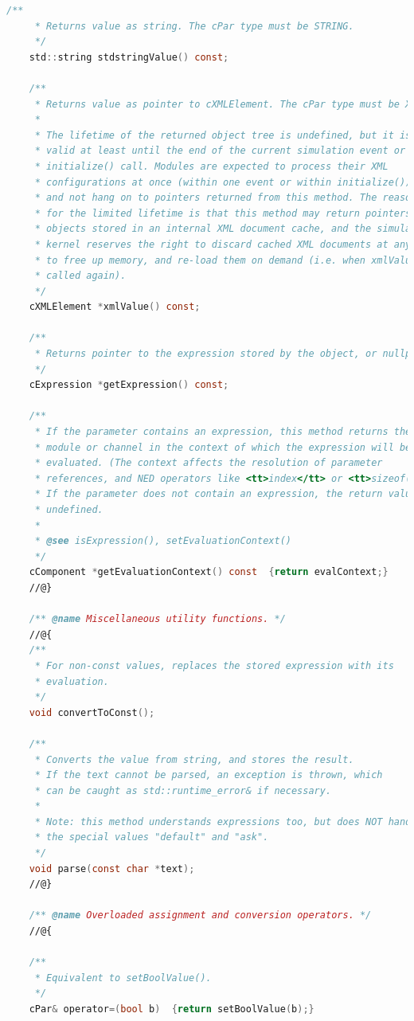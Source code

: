 \begin{lstlisting}[language=c]
    /**
     * Returns value as string. The cPar type must be STRING.
     */
    std::string stdstringValue() const;

    /**
     * Returns value as pointer to cXMLElement. The cPar type must be XML.
     *
     * The lifetime of the returned object tree is undefined, but it is
     * valid at least until the end of the current simulation event or
     * initialize() call. Modules are expected to process their XML
     * configurations at once (within one event or within initialize()),
     * and not hang on to pointers returned from this method. The reason
     * for the limited lifetime is that this method may return pointers to
     * objects stored in an internal XML document cache, and the simulation
     * kernel reserves the right to discard cached XML documents at any time
     * to free up memory, and re-load them on demand (i.e. when xmlValue() is
     * called again).
     */
    cXMLElement *xmlValue() const;

    /**
     * Returns pointer to the expression stored by the object, or nullptr.
     */
    cExpression *getExpression() const;

    /**
     * If the parameter contains an expression, this method returns the
     * module or channel in the context of which the expression will be
     * evaluated. (The context affects the resolution of parameter
     * references, and NED operators like <tt>index</tt> or <tt>sizeof()</tt>.)
     * If the parameter does not contain an expression, the return value is
     * undefined.
     *
     * @see isExpression(), setEvaluationContext()
     */
    cComponent *getEvaluationContext() const  {return evalContext;}
    //@}

    /** @name Miscellaneous utility functions. */
    //@{
    /**
     * For non-const values, replaces the stored expression with its
     * evaluation.
     */
    void convertToConst();

    /**
     * Converts the value from string, and stores the result.
     * If the text cannot be parsed, an exception is thrown, which
     * can be caught as std::runtime_error& if necessary.
     *
     * Note: this method understands expressions too, but does NOT handle
     * the special values "default" and "ask".
     */
    void parse(const char *text);
    //@}

    /** @name Overloaded assignment and conversion operators. */
    //@{

    /**
     * Equivalent to setBoolValue().
     */
    cPar& operator=(bool b)  {return setBoolValue(b);}


\end{lstlisting}
